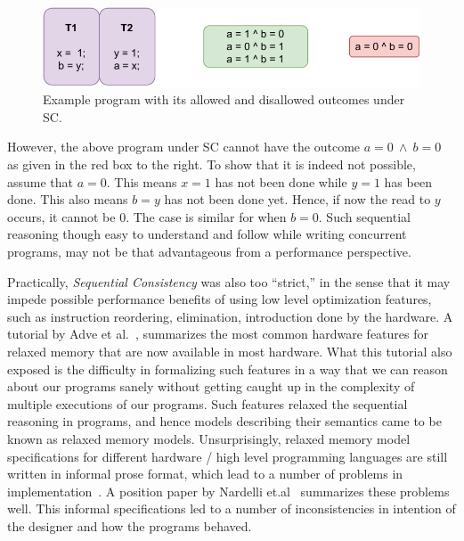 \begin{figure}[H]
    \centering
    \includegraphics[scale=1.0]{2.Background/SC_Example1(a).pdf}
    \caption{Example program with its allowed and disallowed outcomes under SC.}
    \label{intro:Example}
\end{figure}

However, the above program under SC cannot have the outcome $a=0\ \wedge\ b=0$ as given in the red box to the right. To show that it is indeed not possible, assume that $a=0$. This means $x=1$ has not been done while $y=1$ has been done. This also means $b=y$ has not been done yet. Hence, if now the read to $y$ occurs, it cannot be $0$. The case is similar for when $b=0$. 
Such sequential reasoning though easy to understand and follow while writing concurrent programs, may not be that advantageous from a performance perspective.

Practically, \textit{Sequential Consistency} was also too ``strict,'' in the sense that it may impede possible performance benefits of using low level optimization features, such as instruction reordering, elimination, introduction done by the hardware.
A tutorial by Adve et al.~\cite{AdveG}, summarizes the most common hardware features for relaxed memory that are now available in most hardware. 
What this tutorial also exposed is the difficulty in formalizing such features in a way that we can reason about our programs sanely without getting caught up in the complexity of multiple executions of our programs. 
Such features relaxed the sequential reasoning in programs, and hence models describing their semantics came to be known as relaxed memory models.
Unsurprisingly, relaxed memory model specifications for different hardware / high level programming languages are still written in informal prose format, which lead to a number of problems in implementation~\cite{Sewell}. 
A position paper by Nardelli et.al~\cite{Nardelli} summarizes these problems well.
This informal specifications led to a number of inconsistencies in intention of the designer and how the programs behaved.

